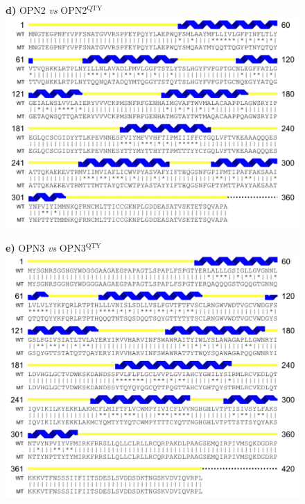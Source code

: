 \documentclass[fleqn,12pt]{supp}
\begin{document}
\newpage
\begin{figure}[H]
    \textbf{d)} OPN2 \textit{vs} OPN2$^{\textrm{QTY}}$ \\
    \includegraphics[width=\linewidth]{FigureS1d.jpg}
\end{figure}

\newpage
\begin{figure}[H]
    \textbf{e)} OPN3 \textit{vs} OPN3$^{\textrm{QTY}}$ \\
    \includegraphics[width=\linewidth]{FigureS1e.jpg}
\end{figure}
\end{document}
